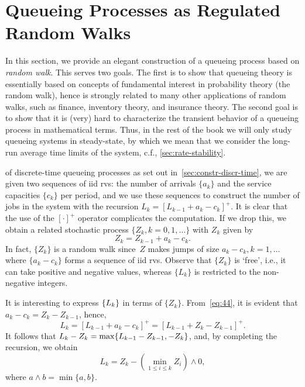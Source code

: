 \documentclass[queueing-book.tex]{subfiles}
\begin{document}
\section{Queueing Processes as Regulated Random Walks}
\label{sec:queu-proc-as}


In this section, we provide an elegant construction of a queueing process based on  \emph{random walk}.
This serves two goals.
The first is to show that queueing theory is essentially based on concepts of fundamental interest in probability theory (the random walk), hence is strongly related to many other applications of random walks, such as finance, inventory theory, and insurance theory.
The second goal is to show that it is (very) hard to characterize the transient behavior of a queueing process in mathematical terms.
Thus, in the rest of the book we will only study queueing systems in steady-state, by which we mean that we consider the long-run average time limits of the system, c.f., \cref{sec:rate-stability}.




 of discrete-time queueing processes as set out in~\cref{sec:constr-discr-time}, we are given two sequences of iid rvs: the number of arrivals $\{a_k\}$ and the service capacities $\{c_k\}$ per period, and we use these sequences to construct the number of jobs in the system with the recursion $L_k = [L_{k-1} +a_k- c_{k}]^+$.
It is clear that the use of the $[\cdot]^{+}$ operator complicates the computation.
If we drop this, we obtain a related stochastic process $\{Z_k, k=0,1,\ldots\}$ with $Z_k$ given by
\begin{equation}\label{eq:44}
 Z_k = Z_{k-1} + a_k - c_k.
\end{equation}
In fact, $\{Z_k\}$ is a random walk since~$Z$ makes jumps of size $a_k-c_k, k=1,\ldots$ where $\{a_k-c_k\}$ forms a sequence of iid rvs.
Observe that $\{Z_k\}$ is `free', i.e., it can take positive and negative values, whereas $\{L_{k}\}$ is restricted to the non-negative integers.

It is interesting to express $\{L_k\}$ in terms of $\{Z_k\}$. From~\cref{eq:44}, it is evident that $a_k - c_k = Z_k - Z_{k-1}$, hence,
\begin{equation*}
 L_k = [L_{k-1} +a_k- c_{k}]^+ = [L_{k-1} +Z_k- Z_{k-1}]^+.
\end{equation*}
It follows that  $L_k - Z_{k} = \max\{L_{k-1} - Z_{k-1}, -Z_k\}$,
and, by completing the recursion, we obtain
\begin{equation}\label{eq:reich1}
 L_k = Z_k - \left(\min_{1\leq i \leq k} Z_i\right)\wedge 0,
\end{equation}
where $a\wedge b = \min\{a,b\}$.
\end{document}
